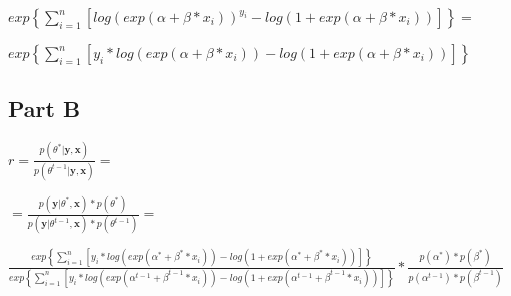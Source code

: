 \documentclass{article}\usepackage[]{graphicx}\usepackage[]{color}
\begin{document}
$exp\left\{ \sum_{i=1}^{n}\left[log\left(exp(\alpha+\beta*x_{i})\right)^{y_{i}}-log\left(1+exp(\alpha+\beta*x_{i})\right)\right]\right\} =$

$exp\left\{ \sum_{i=1}^{n}\left[y_{i}*log\left(exp(\alpha+\beta*x_{i})\right)-log\left(1+exp(\alpha+\beta*x_{i})\right)\right]\right\}$
\subsection*{Part B}
$r=\frac{p(\theta^{*}|\boldsymbol{y},\boldsymbol{x})}{{p(\theta^{t-1}|\boldsymbol{y},\boldsymbol{x})}}=$

$=\frac{p(\boldsymbol{y}|\theta^{*},\boldsymbol{x})*p(\theta^{*})}{p(\boldsymbol{y}|\theta^{t-1},\boldsymbol{x})*p(\theta^{t-1})}=$

$\frac{exp\left\{ \sum_{i=1}^{n}\left[y_{i}*log\left(exp(\alpha^{*}+\beta^{*}*x_{i})\right)-log\left(1+exp(\alpha^{*}+\beta^{*}*x_{i})\right)\right]\right\} }{exp\left\{ \sum_{i=1}^{n}\left[y_{i}*log\left(exp(\alpha^{t-1}+\beta^{t-1}*x_{i})\right)-log\left(1+exp(\alpha^{t-1}+\beta^{t-1}*x_{i})\right)\right]\right\} }*\frac{p(\alpha^{*})*p(\beta^{*})}{p(\alpha^{t-1})*p(\beta^{t-1})}$
\end{document}
